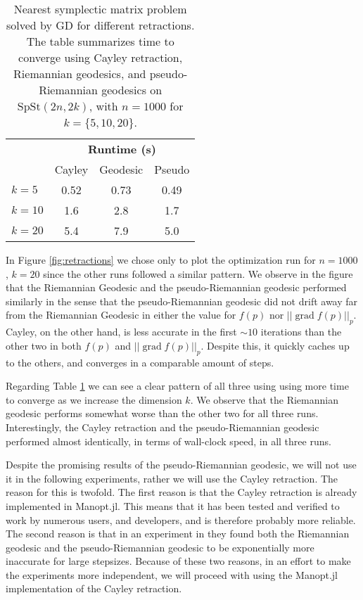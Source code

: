 \begin{table}
    \centering
    \caption[Retraction comparison timetable]{Nearest symplectic matrix problem solved by GD for different retractions. The table summarizes time to converge using Cayley retraction, Riemannian geodesics, and pseudo-Riemannian geodesics on $\mathrm{SpSt}(2n, 2k)$, with $n=1000$ for $k=\{5,10,20\}$. }\label{tab:exp1}
    \begin{tabular}{ l c c c }\label{tbl:Retraction_comparison}
        & \multicolumn{3}{c}{\textbf{Runtime (s)}} \\ 
        \cmidrule(l){2-4}
        & Cayley & Geodesic & Pseudo \\
        \midrule
        $k=5$ & 0.52 & 0.73 & 0.49 \\
        $k=10$ & 1.6 & 2.8 & 1.7 \\
        $k=20$ & 5.4 & 7.9 & 5.0
    \end{tabular}
\end{table}

In Figure \ref{fig:retractions} we chose only to plot the optimization run for $n=1000$, $k=20$ since the other runs followed a similar pattern. We observe in the figure that the Riemannian Geodesic and the pseudo-Riemannian geodesic performed similarly in the sense that the pseudo-Riemannian geodesic did not drift away far from the Riemannian Geodesic in either the value for $f(p)$ nor $\lvert \lvert \operatorname{grad}f(p) \rvert \rvert_{p}$. Cayley, on the other hand, is less accurate in the first $\sim10$ iterations than the other two in both  $f(p)$ and $\lvert \lvert \operatorname{grad}f(p) \rvert \rvert_{p}$. Despite this, it quickly caches up to the others, and converges in a comparable amount of steps. 

Regarding Table \ref{tbl:Retraction_comparison} we can see a clear pattern of all three using using more time to converge as we increase the dimension $k$. We observe that the Riemannian geodesic performs somewhat worse than the other two for all three runs. Interestingly, the Cayley retraction and the pseudo-Riemannian geodesic performed almost identically, in terms of wall-clock speed, in all three runs. 

Despite the promising results of the pseudo-Riemannian geodesic, we will not use it in the following experiments, rather we will use the Cayley retraction. The reason for this is twofold. The first reason is that the Cayley retraction is already implemented in Manopt.jl. This means that it has been tested and verified to work by numerous users, and developers, and is therefore probably more reliable. The second reason is that in an experiment in \cite[p.~26]{BendokatZimmermann2021} they found both the Riemannian geodesic and the pseudo-Riemannian geodesic to be exponentially more inaccurate for large stepsizes. Because of these two reasons, in an effort to make the experiments more independent, we will proceed with using the Manopt.jl implementation of the Cayley retraction.